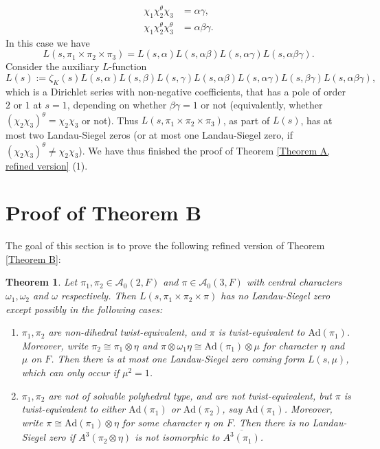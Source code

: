 \documentclass[12pt]{amsart}
\newcommand{\Ad}{\text{Ad}}
\newcommand{\cA}{\mathcal{A}}
\newcommand{\ov}{\overline}
\newtheorem{theorem}{Theorem}[section]
\begin{document}
\begin{enumerate}
\begin{enumerate}
\begin{enumerate}
\begin{align*}
                    \chi_1\chi_2^{\theta}\chi_3 &= \alpha\gamma, \\
                    \chi_1\chi_2^{\theta}\chi_3^{\theta} &= \alpha\beta\gamma.
            \end{align*}
            In this case we have 
            $$L(s,\pi_1 \times \pi_2 \times \pi_3) = L(s,\alpha)L(s,\alpha\beta)L(s,\alpha\gamma)L(s,\alpha\beta\gamma).$$
            Consider the auxiliary $L$-function
            $$L(s) := \zeta_{K}(s)L(s,\alpha)L(s,\beta)L(s,\gamma)L(s,\alpha\beta)L(s,\alpha\gamma)L(s,\beta\gamma)L(s,\alpha\beta\gamma),$$
            which is a Dirichlet series with non-negative coefficients, that has a pole of order $2$ or $1$ at $s=1$, depending on whether $\beta\gamma = 1$ or not (equivalently, whether $(\chi_2\chi_3)^\theta = \chi_2\chi_3$ or not). Thus $L(s,\pi_1 \times \pi_2 \times \pi_3)$, as part of $L(s)$, has at most two Landau-Siegel zeros (or at most one Landau-Siegel zero, if $(\chi_2\chi_3)^\theta \neq \chi_2\chi_3$). We have thus finished the proof of Theorem \ref{Theorem A, refined version} (1).
        \end{enumerate}
    \end{enumerate}
\end{enumerate}



\section{Proof of Theorem B}\label{Section 4}

The goal of this section is to prove the following refined version of Theorem \ref{Theorem B}:

\begin{theorem}\label{Theorem B, refined version}
    Let $\pi_1,\pi_2 \in \cA_0(2,F)$ and $\pi \in \cA_0(3,F)$ with central characters $\omega_1,\omega_2$ and $\omega$ respectively. Then $L(s,\pi_1 \times \pi_2 \times \pi)$ has no Landau-Siegel zero except possibly in the following cases:
    \begin{enumerate}
        \item $\pi_1,\pi_2$ are non-dihedral twist-equivalent, and $\pi$ is twist-equivalent to $\Ad(\pi_1)$. Moreover, write $\pi_2 \cong \pi_1 \otimes \eta$ and $\pi \otimes \omega_1\eta \cong \Ad(\pi_1) \otimes \mu$ for character $\eta$ and $\mu$ on $F$. Then there is at most one Landau-Siegel zero coming form $L(s,\mu)$, which can only occur if $\mu^2 = 1$.
        \item $\pi_1,\pi_2$ are not of solvable polyhedral type, and are not twist-equivalent, but $\pi$ is twist-equivalent to either $\Ad(\pi_1)$ or $\Ad(\pi_2)$, say $\Ad(\pi_1)$. Moreover, write $\pi \cong \Ad(\pi_1) \otimes \eta$ for some character $\eta$ on $F$. Then there is no Landau-Siegel zero if $A^3(\pi_2 \otimes \eta)$ is not isomorphic to $\ov{A^3(\pi_1)}$. 
    \end{enumerate}
\end{theorem}
\end{document}
